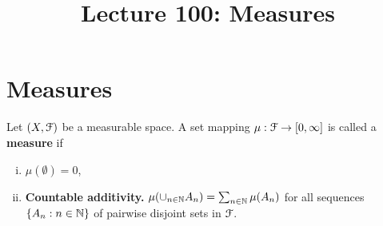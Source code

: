 \documentclass[a4paper,english,12pt]{article}
\title{Lecture 100: Measures}
\author{}
\begin{document}
\maketitle

\section{Measures}
\begin{defn}%
Let $(X, \mathcal{F})$ be a measurable space. A set mapping $\mu: \mathcal{F} \to [0, \infty]$ is called a \textbf{measure} if 
\begin{enumerate}[i.]
	\item $\mu (\emptyset) = 0$,
	\item \textbf{Countable additivity.} $\mu(\cup_{n \in \mathbb{N}}A_n) = \sum_{n \in \mathbb{N}} \mu(A_n)$ for all sequences $\{A_n: n \in \mathbb{N}\}$ of pairwise disjoint sets in $\mathcal{F}$.
\end{enumerate}
\end{defn}
\end{document}

